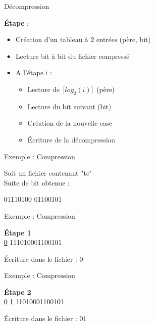 \documentclass[french]{beamer}
\begin{document}
\begin{frame}{Décompression}
	\begin{center}
	\textbf{Étape} :
		\begin{itemize}
		\item<2-8>  Création d'un tableau à 2 entrées (père, bit)
		\item<3-8> Lecture bit à bit du fichier compressé
		\item<4-8>  A l'étape i : 
			\begin{itemize}
				\item<5-8> Lecture de $\lceil log_{2}(i) \rceil$ (père)
				\item<6-8> Lecture du bit suivant (bit) 
				\item<7-8> Création de la nouvelle case
				\item<8> Écriture de la décompression  
			\end{itemize}
		\end{itemize}
	\end{center}
\end{frame}

\begin{frame}{Exemple : Compression}
	\begin{center}
	Soit un fichier contenant "te"\\
	Suite de bit obtenue : 
	\end{center}	
	\begin{center}	
	01110100 01100101
	\end{center}
\end{frame}

\begin{frame}{Exemple : Compression}
	\begin{center}
	\textbf{Étape 1} \\
	\underline{0} 111010001100101 \\
	\end{center}
	\begin{flushleft}
	Écriture dans le fichier : 0
	\end{flushleft}
\end{frame}

\begin{frame}{Exemple : Compression}
	\begin{center}
	\textbf{Étape 2} \\
	\underline{0} \underline{1} 11010001100101 \\
	\end{center}
	\begin{flushleft}
	Écriture dans le fichier : 01
	\end{flushleft}
\end{frame}
\end{document}
